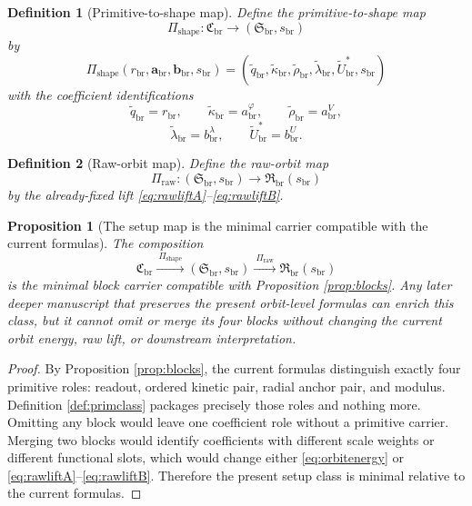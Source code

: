 \documentclass[11pt]{article}
\newcommand{\RespShapeReadout}{\widetilde q_{\mathrm{br}}}
\newcommand{\RespShapeCov}{\widetilde\kappa_{\mathrm{br}}}
\newcommand{\RespShapeRelax}{\widetilde\rho_{\mathrm{br}}}
\newcommand{\RespShapeWell}{\widetilde\lambda_{\mathrm{br}}}
\newcommand{\RespShapeEq}{\widetilde U_{\mathrm{br}}^{\ast}}
\newcommand{\ShapeTuple}{\mathfrak S_{\mathrm{br}}}
\newcommand{\RawTuple}{\mathfrak R_{\mathrm{br}}}
\newcommand{\ScaleMod}{s_{\mathrm{br}}}
\newcommand{\PrimClass}{\mathfrak C_{\mathrm{br}}}
\newcommand{\PrimRead}{r_{\mathrm{br}}}
\newcommand{\PrimCovSlot}{a_{\mathrm{br}}^{\varphi}}
\newcommand{\PrimRelaxSlot}{a_{\mathrm{br}}^{V}}
\newcommand{\PrimKinetic}{\bm a_{\mathrm{br}}}
\newcommand{\PrimWellSlot}{b_{\mathrm{br}}^{\lambda}}
\newcommand{\PrimEqSlot}{b_{\mathrm{br}}^{U}}
\newcommand{\PrimAnchor}{\bm b_{\mathrm{br}}}
\newcommand{\PrimMap}{\Pi_{\mathrm{shape}}}
\newcommand{\RawMap}{\Pi_{\mathrm{raw}}}
\newtheorem{definition}{Definition}
\newtheorem{proposition}{Proposition}
\begin{document}
\begin{definition}[Primitive-to-shape map]
\label{def:pitoshape}
Define the primitive-to-shape map
\begin{equation}
\PrimMap:\PrimClass\longrightarrow (\ShapeTuple,\ScaleMod)
\label{eq:pitoshape}
\end{equation}
by
\begin{equation}
\PrimMap(\PrimRead,\PrimKinetic,\PrimAnchor,\ScaleMod)
=
(\RespShapeReadout,\RespShapeCov,\RespShapeRelax,\RespShapeWell,\RespShapeEq,\ScaleMod)
\label{eq:pitoshapeexplicit}
\end{equation}
with the coefficient identifications
\begin{equation}
\RespShapeReadout=\PrimRead,
\qquad
\RespShapeCov=\PrimCovSlot,
\qquad
\RespShapeRelax=\PrimRelaxSlot,
\label{eq:pitoshapeA}
\end{equation}
\begin{equation}
\RespShapeWell=\PrimWellSlot,
\qquad
\RespShapeEq=\PrimEqSlot.
\label{eq:pitoshapeB}
\end{equation}
\end{definition}

\begin{definition}[Raw-orbit map]
\label{def:rawmap}
Define the raw-orbit map
\begin{equation}
\RawMap:(\ShapeTuple,\ScaleMod)\longrightarrow \RawTuple(\ScaleMod)
\label{eq:rawmap}
\end{equation}
by the already-fixed lift \eqref{eq:rawliftA}--\eqref{eq:rawliftB}.
\end{definition}

\begin{proposition}[The setup map is the minimal carrier compatible with the current formulas]
\label{prop:minimal}
The composition
\[
\PrimClass
\xrightarrow{\ \PrimMap\ }
(\ShapeTuple,\ScaleMod)
\xrightarrow{\ \RawMap\ }
\RawTuple(\ScaleMod)
\]
is the minimal block carrier compatible with Proposition \ref{prop:blocks}. Any later deeper manuscript that preserves the present orbit-level formulas can enrich this class, but it cannot omit or merge its four blocks without changing the current orbit energy, raw lift, or downstream interpretation.
\end{proposition}

\begin{proof}
By Proposition \ref{prop:blocks}, the current formulas distinguish exactly four primitive roles: readout, ordered kinetic pair, radial anchor pair, and modulus. Definition \ref{def:primclass} packages precisely those roles and nothing more. Omitting any block would leave one coefficient role without a primitive carrier. Merging two blocks would identify coefficients with different scale weights or different functional slots, which would change either \eqref{eq:orbitenergy} or \eqref{eq:rawliftA}--\eqref{eq:rawliftB}. Therefore the present setup class is minimal relative to the current formulas.
\end{proof}
\end{document}
